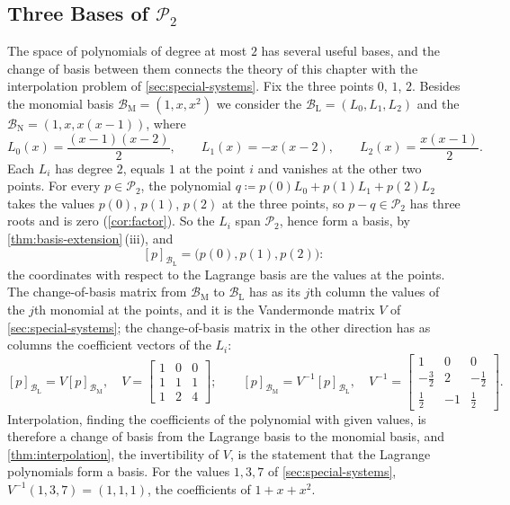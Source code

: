 \subsection{Three Bases of \texorpdfstring{$\mathcal P_2$}{P2}}

The space of polynomials of degree at most $2$ has several useful bases, and the change of basis between them connects the theory of this chapter with the interpolation problem of \cref{sec:special-systems}. Fix the three points $0$, $1$, $2$. Besides the monomial basis $\mathcal B_{\mathrm M}=(1,x,x^2)$ we consider the  $\mathcal B_{\mathrm L}=(L_0,L_1,L_2)$ and the  $\mathcal B_{\mathrm N}=(1,x,x(x-1))$, where
\[
L_0(x)=\frac{(x-1)(x-2)}2,\qquad L_1(x)=-x(x-2),\qquad L_2(x)=\frac{x(x-1)}2 .
\]
Each $L_i$ has degree $2$, equals $1$ at the point $i$ and vanishes at the other two points. For every $p\in\mathcal P_2$, the polynomial $q\coloneqq p(0)L_0+p(1)L_1+p(2)L_2$ takes the values $p(0)$, $p(1)$, $p(2)$ at the three points, so $p-q\in\mathcal P_2$ has three roots and is zero (\cref{cor:factor}). So the $L_i$ span $\mathcal P_2$, hence form a basis, by \cref{thm:basis-extension}\,(iii), and
\[
[p]_{\mathcal B_{\mathrm L}}=\bigl(p(0),p(1),p(2)\bigr):
\]
the coordinates with respect to the Lagrange basis are the values at the points. The change-of-basis matrix from $\mathcal B_{\mathrm M}$ to $\mathcal B_{\mathrm L}$ has as its $j$th column the values of the $j$th monomial at the points, and it is the Vandermonde matrix $V$ of \cref{sec:special-systems}; the change-of-basis matrix in the other direction has as columns the coefficient vectors of the $L_i$:
\[
[p]_{\mathcal B_{\mathrm L}}=V[p]_{\mathcal B_{\mathrm M}},\quad V=\begin{bmatrix}1&0&0\\1&1&1\\1&2&4\end{bmatrix};\qquad
[p]_{\mathcal B_{\mathrm M}}=V^{-1}[p]_{\mathcal B_{\mathrm L}},\quad V^{-1}=\begin{bmatrix}1&0&0\\-\frac32&2&-\frac12\\\frac12&-1&\frac12\end{bmatrix}.
\]
Interpolation, finding the coefficients of the polynomial with given values, is therefore a change of basis from the Lagrange basis to the monomial basis, and \cref{thm:interpolation}, the invertibility of $V$, is the statement that the Lagrange polynomials form a basis. For the values $1,3,7$ of \cref{sec:special-systems}, $V^{-1}(1,3,7)=(1,1,1)$, the coefficients of $1+x+x^2$.

